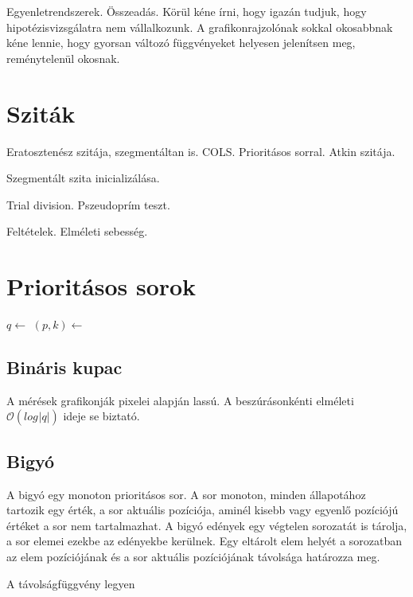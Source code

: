 \documentclass[12pt]{report}
\begin{document}
Egyenletrendszerek. Összeadás.
Körül kéne írni, hogy igazán tudjuk, hogy hipotézisvizsgálatra nem vállalkozunk.
A grafikonrajzolónak sokkal okosabbnak kéne lennie, hogy gyorsan változó függvényeket
helyesen jelenítsen meg, reménytelenül okosnak.

\section{Sziták}

Eratosztenész szitája, szegmentáltan is. COLS. Prioritásos sorral. Atkin szitája.

Szegmentált szita inicializálása.

Trial division. Pszeudoprím teszt.

Feltételek. Elméleti sebesség.

\section{Prioritásos sorok}

\begin{algorithmic}[1]
\State $q \gets$ 
		\State $(p, k) \gets $ 
		\State {}
		\State {}
	\EndWhile
		\State {}
	\EndIf
\EndFor
\end{algorithmic}

\subsection{Bináris kupac}

A mérések grafikonják pixelei alapján lassú. A beszúrásonkénti elméleti
$\mathcal{O}(log_{}{|q|})$ ideje se biztató.

\subsection{Bigyó}

A bigyó egy monoton prioritásos sor.
A sor monoton, minden állapotához tartozik egy érték, a sor aktuális pozíciója,
aminél kisebb vagy egyenlő pozíciójú értéket a sor nem tartalmazhat.
A bigyó edények egy végtelen sorozatát is tárolja, a sor elemei ezekbe az edényekbe kerülnek.
Egy eltárolt elem helyét a sorozatban az elem pozíciójának
és a sor aktuális pozíciójának távolsága határozza meg.

A távolságfüggvény legyen
\end{document}

